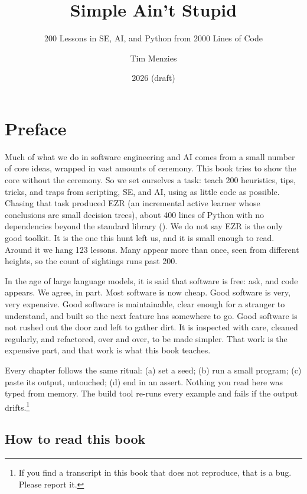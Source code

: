 \documentclass[
  justified]{tufte-book}
\title{Simple Ain't Stupid}
\subtitle{200 Lessons in SE, AI, and Python from 2000 Lines of Code}
\author{Tim Menzies}
\date{2026 (draft)}
\begin{document}
\frontmatter
\maketitle

\mainmatter
\chapter*{Preface}\label{preface}

Much of what we do in software engineering and AI comes from a small
number of core ideas, wrapped in vast amounts of ceremony. This book
tries to show the core without the ceremony. So we set ourselves a task:
teach 200 heuristics, tips, tricks, and traps from scripting, SE, and
AI, using as little code as possible. Chasing that task produced EZR (an
incremental active learner whose conclusions are small decision trees),
about 400 lines of Python with no dependencies beyond the standard
library (). We
do not say EZR is the only good toolkit. It is the one this hunt left
us, and it is small enough to read. Around it we hang 123 lessons. Many
appear more than once, seen from different heights, so the count of
sightings runs past 200.

In the age of large language models, it is said that software is free:
ask, and code appears. We agree, in part. Most software is now cheap.
Good software is very, very expensive. Good software is maintainable,
clear enough for a stranger to understand, and built so the next feature
has somewhere to go. Good software is not rushed out the door and left
to gather dirt. It is inspected with care, cleaned regularly, and
refactored, over and over, to be made simpler. That work is the
expensive part, and that work is what this book teaches.

Every chapter follows the same ritual: (a) set a seed; (b) run a small
program; (c) paste its output, untouched; (d) end in an assert. Nothing
you read here was typed from memory. The build tool re-runs every
example and fails if the output drifts.\footnote{If you find a
  transcript in this book that does not reproduce, that is a bug. Please
  report it.}

\section*{How to read this book}\label{how-to-read-this-book}
\end{document}
